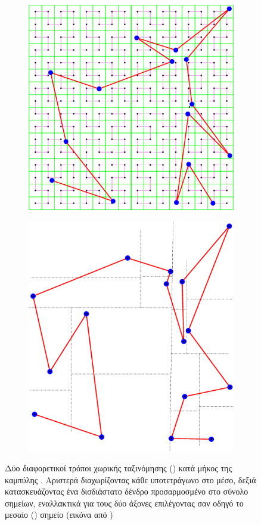\begin{figure}[]
  \begin{subfigure}{.5\textwidth}
    \centering
    \includegraphics[width=.8\textwidth]{figures/hilbert-sort-middle.png}
  \end{subfigure}
  \begin{subfigure}{.5\textwidth}
    \centering
    \includegraphics[width=.8\textwidth]{figures/hilbert-sort-median.png}
  \end{subfigure}
  \caption[Χωρική ταξινόμηση]{Δύο διαφορετικοί τρόποι χωρικής ταξινόμησης () κατά μήκος της καμπύλης . Αριστερά διαχωρίζοντας κάθε
    υποτετράγωνο στο μέσο, δεξιά κατασκευάζοντας ένα δισδιάστατο δένδρο προσαρμοσμένο στο
    σύνολο σημείων, εναλλακτικά για τους δύο άξονες επιλέγοντας σαν οδηγό το μεσαίο
    () σημείο (εικόνα από )}
  \label{fig:spatial-sort}
\end{figure}

